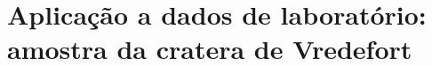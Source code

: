 \chapter{Aplicação a dados de laboratório: amostra da cratera de Vredefort}
\label{sec:lab_application}

 

%
%
%

